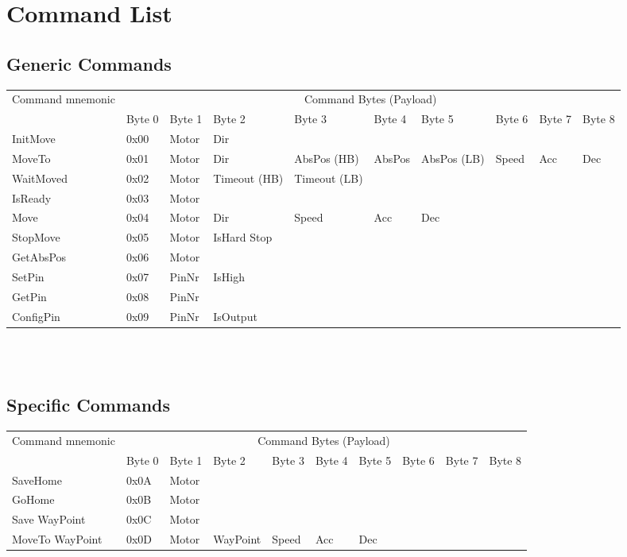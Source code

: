 \documentclass[10pt,a4paper]{article}
\newcommand{\IMV}{0x00}
\newcommand{\MTO}{0x01}
\newcommand{\WTM}{0x02}
\newcommand{\IRD}{0x03}
\newcommand{\MOV}{0x04}
\newcommand{\SPM}{0x05}
\newcommand{\GAP}{0x06}
\newcommand{\STP}{0x07}
\newcommand{\GTP}{0x08}
\newcommand{\CNP}{0x09}
\newcommand{\SVH}{0x0A}
\newcommand{\GOH}{0x0B}
\newcommand{\SWP}{0x0C}
\newcommand{\MWP}{0x0D}
\begin{document}
\section{Command List}
\subsection{Generic Commands}
\begin{tabular}{|p{1.8cm}|p{1cm}|p{1cm}|p{1.3cm}|p{1.2cm}|p{1cm}|p{1cm}|p{1cm}|p{1cm}|p{1cm}|}
	\hline
	\multirow{2}{2cm}{Command mnemonic} & \multicolumn{9}{c|}{Command Bytes (Payload)} \\\cline{2-10} 
		&  Byte 0 & Byte 1 & Byte 2 & Byte 3 & Byte 4 & Byte 5 & Byte 6 & Byte 7 & Byte 8\\ \hline
	InitMove	& \IMV	& Motor	& Dir & & & & & & \\\hline
	MoveTo		& \MTO	& Motor	& Dir & AbsPos (HB) & AbsPos & AbsPos (LB) & Speed & Acc & Dec \\\hline
	WaitMoved	& \WTM	& Motor	& Timeout (HB) & Timeout (LB)& & & & & \\\hline
	IsReady	& \IRD	& Motor	& & & & & & & \\\hline
	Move	& \MOV	& Motor	& Dir & Speed & Acc & Dec & & & \\\hline
	StopMove & \SPM& Motor	& IsHard Stop & & & & & & \\\hline
	GetAbsPos& \GAP& Motor	& & & & & & & \\\hline
	SetPin	& \STP	& PinNr	& IsHigh & & & & & & \\\hline
	GetPin	& \GTP	& PinNr	& & & & & & & \\\hline
	ConfigPin& \CNP& PinNr	& IsOutput & & & & & & \\\hline	
\end{tabular}
\\\\

\subsection{Specific Commands}
\begin{tabular}{|p{1.8cm}|p{1cm}|p{1cm}|p{1.4cm}|p{1cm}|p{1cm}|p{1cm}|p{1cm}|p{1cm}|p{1cm}|}
	\hline
	\multirow{2}{2cm}{Command mnemonic} & \multicolumn{9}{c|}{Command Bytes (Payload)} \\\cline{2-10} 
		&  Byte 0 & Byte 1 & Byte 2 & Byte 3 & Byte 4 & Byte 5 & Byte 6 & Byte 7 & Byte 8 \\ \hline
	SaveHome	& \SVH	& Motor	& & & & & & & \\\hline
	GoHome		& \GOH	& Motor	& & & & & & & \\\hline
	Save \mbox{WayPoint}& \SWP	& Motor	& & & & & & & \\\hline
	MoveTo WayPoint& \MWP& Motor	& WayPoint & Speed & Acc & Dec & & & \\\hline
\end{tabular}
\end{document}
